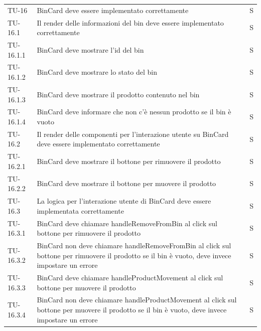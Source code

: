 \begin{xltabular}{0.9\textwidth}{X | p{0.6\textwidth} | p{0.1\textwidth} }
    TU-16 & BinCard deve essere implementato correttamente & S\\
    TU-16.1 & Il render delle informazioni del bin deve essere implementato correttamente & S\\
    TU-16.1.1 & BinCard deve mostrare l'id del bin & S\\
    TU-16.1.2 & BinCard deve mostrare lo stato del bin & S\\
    TU-16.1.3 & BinCard deve mostrare il prodotto contenuto nel bin & S\\
    TU-16.1.4 & BinCard deve informare che non c'è nessun prodotto se il bin è vuoto & S\\
    TU-16.2 & Il render delle componenti per l'interazione utente su BinCard deve essere implementato correttamente & S\\
    TU-16.2.1 & BinCard deve mostrare il bottone per rimuovere il prodotto & S\\
    TU-16.2.2 & BinCard deve mostrare il bottone per muovere il prodotto & S\\
    TU-16.3 & La logica per l'interazione utente di BinCard deve essere implementata correttamente & S\\
    TU-16.3.1 & BinCard deve chiamare handleRemoveFromBin al click sul bottone per rimuovere il prodotto & S\\
    TU-16.3.2 & BinCard non deve chiamare handleRemoveFromBin al click sul bottone per rimuovere il prodotto se il bin è vuoto, deve invece impostare un errore & S\\
    TU-16.3.3 & BinCard deve chiamare handleProductMovement al click sul bottone per muovere il prodotto & S\\
    TU-16.3.4 & BinCard non deve chiamare handleProductMovement al click sul bottone per muovere il prodotto se il bin è vuoto, deve invece impostare un errore & S\\


\end{xltabular}
